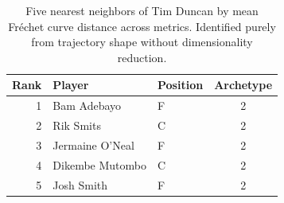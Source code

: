 \begin{table}[htbp]
  \centering\small
  \begin{tabular}{rllc}
    \toprule
    Rank & Player & Position & Archetype \\
    \midrule
    1 & Bam Adebayo & F & 2 \\
    2 & Rik Smits & C & 2 \\
    3 & Jermaine O'Neal & F & 2 \\
    4 & Dikembe Mutombo & C & 2 \\
    5 & Josh Smith & F & 2 \\
    \bottomrule
  \end{tabular}
  \caption{Five nearest neighbors of Tim Duncan by mean Fr\'{e}chet curve distance across metrics. Identified purely from trajectory shape without dimensionality reduction.}
  \label{tab:Tim_Duncan_frechet_curve_neighbors}
\end{table}

